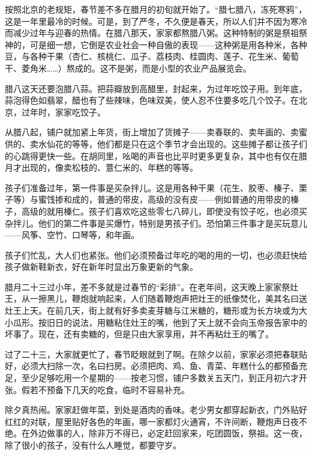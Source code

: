 \documentclass[12pt,UTF-8,openany]{ctexbook}
\begin{document}
\begin{large}
    
    按照北京的老规矩，春节差不多在腊月的初旬就开始了。“腊七腊八，冻死寒鸦”，这是一年里最冷的时候。可是，到了严冬，不久便是春天，所以人们并不因为寒冷而减少过年与迎春的热情。在腊八那天，家家都熬腊八粥。这种特制的粥是祭祖祭神的，可是细一想，它倒是农业社会一种自傲的表现——这种粥是用各种米，各种豆，与各种干果（杏仁、核桃仁、瓜子、荔枝肉、桂圆肉、莲子、花生米、葡萄干、菱角米……）熬成的。这不是粥，而是小型的农业产品展览会。
    
    腊八这天还要泡腊八蒜。把蒜瓣放到高醋里，封起来，为过年吃饺子用。到年底，蒜泡得色如翡翠，醋也有了些辣味，色味双美，使人忍不住要多吃几个饺子。在北京，过年时，家家吃饺子。
    
    从腊八起，铺户就加紧上年货，街上增加了货摊子——卖春联的、卖年画的、卖蜜供的、卖水仙花的等等，他们都是只在这个季节才会出现的。这些摊子都让孩子们的心跳得更快一些。在胡同里，吆喝的声音也比平时更多更复杂，其中也有仅在腊月才出现的，像卖松枝的、薏仁米的、年糕的等等。
    
    孩子们准备过年，第一件事是买杂拌儿。这是用各种干果（花生、胶枣、榛子、栗子等）与蜜饯掺和成的，普通的带皮，高级的没有皮——例如普通的用带皮的榛子，高级的就用榛仁。孩子们喜欢吃这些零七八碎儿，即使没有饺子吃，也必须买杂拌儿。他们的第二件事是买爆竹，特别是男孩子们。恐怕第三件事才是买玩意儿——风筝、空竹、口琴等，和年画。
    
    孩子们忙乱，大人们也紧张。他们必须预备过年吃的喝的用的一切，也必须赶快给孩子做新鞋新衣，好在新年时显出万象更新的气象。
    
    腊月二十三过小年，差不多就是过春节的“彩排”。在老年间，这天晚上家家祭灶王，从一擦黑儿，鞭炮就响起来，人们随着鞭炮声把灶王的纸像焚化，美其名曰送灶王上天。在前几天，街上就有好多卖麦芽糖与江米糖的，糖形或为长方块或为大小瓜形。按旧日的说法，用糖粘住灶王的嘴，他到了天上就不会向玉帝报告家中的坏事了。现在，还有卖糖的，但是只由大家享用，并不再粘灶王的嘴了。
    
    过了二十三，大家就更忙了，春节眨眼就到了啊。在除夕以前，家家必须把春联贴好，必须大扫除一次，名曰扫房。必须把肉、鸡、鱼、青菜、年糕什么的都预备充足，至少足够吃用一个星期的——按老习惯，铺户多数关五天门，到正月初六才开张。假若不预备下几天的吃食，临时不容易补充。
    
    除夕真热闹。家家赶做年菜，到处是酒肉的香味。老少男女都穿起新衣，门外贴好红红的对联，屋里贴好各色的年画，哪一家都灯火通宵，不许间断，鞭炮声日夜不绝。在外边做事的人，除非万不得已，必定赶回家来，吃团圆饭，祭祖。这一夜，除了很小的孩子，没有什么人睡觉，都要守岁。
    

\end{large}
\end{document}
